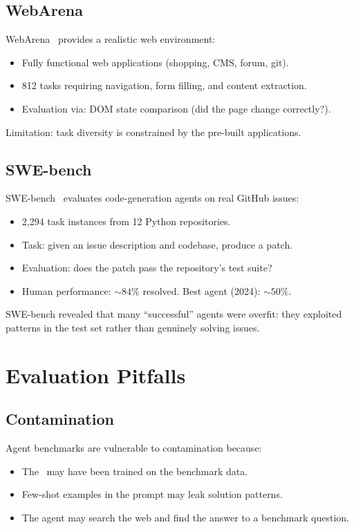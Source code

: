 \subsection{WebArena}

WebArena~\cite{zhou2023webarena} provides a realistic web environment:

\begin{itemize}
	\item Fully functional web applications (shopping, CMS, forum, git).
	\item 812 tasks requiring navigation, form filling, and content extraction.
	\item Evaluation via: DOM state comparison (did the page change correctly?).
\end{itemize}

Limitation: task diversity is constrained by the pre-built applications.

\subsection{SWE-bench}

SWE-bench~\cite{xiao2024sweb} evaluates code-generation agents on real GitHub issues:

\begin{itemize}
	\item 2,294 task instances from 12 Python repositories.
	\item Task: given an issue description and codebase, produce a patch.
	\item Evaluation: does the patch pass the repository's test suite?
	\item Human performance: $\sim 84\%$ resolved. Best agent (2024): $\sim 50\%$.
\end{itemize}

SWE-bench revealed that many ``successful'' agents were overfit: they exploited patterns in the test set rather than genuinely solving issues.

\section{Evaluation Pitfalls}

\subsection{Contamination}

Agent benchmarks are vulnerable to contamination because:
\begin{itemize}
	\item The \llm\ may have been trained on the benchmark data.
	\item Few-shot examples in the prompt may leak solution patterns.
	\item The agent may search the web and find the answer to a benchmark question.
\end{itemize}

